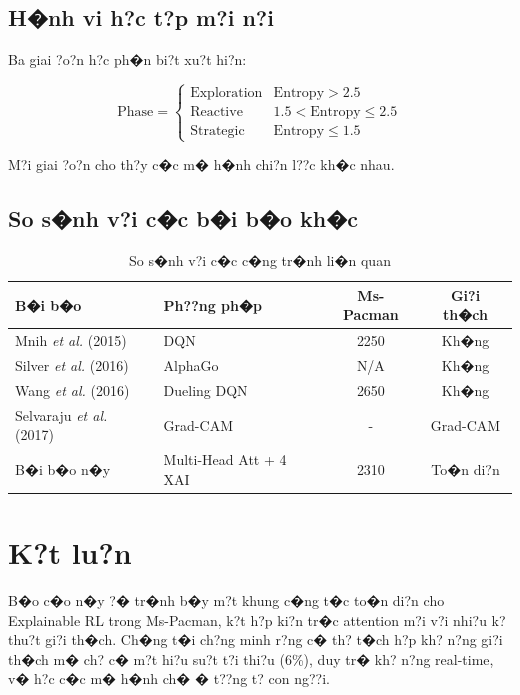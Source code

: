 \documentclass[11pt,a4paper]{article}
\begin{document}
\subsection{H�nh vi h?c t?p m?i n?i}

Ba giai ?o?n h?c ph�n bi?t xu?t hi?n:

\begin{equation}
\text{Phase} = \begin{cases}
\text{Exploration} & \text{Entropy} > 2.5 \\
\text{Reactive} & 1.5 < \text{Entropy} \le 2.5 \\
\text{Strategic} & \text{Entropy} \le 1.5
\end{cases}
\end{equation}

M?i giai ?o?n cho th?y c�c m� h�nh chi?n l??c kh�c nhau.

\subsection{So s�nh v?i c�c b�i b�o kh�c}

\begin{table}[H]
\centering
\small
\begin{tabular}{llcc}
\toprule
\textbf{B�i b�o} & \textbf{Ph??ng ph�p} & \textbf{Ms-Pacman} & \textbf{Gi?i th�ch} \\
\midrule
Mnih \textit{et al.} (2015) & DQN & 2250 & Kh�ng \\
Silver \textit{et al.} (2016) & AlphaGo & N/A & Kh�ng \\
Wang \textit{et al.} (2016) & Dueling DQN & 2650 & Kh�ng \\
Selvaraju \textit{et al.} (2017) & Grad-CAM & - & Grad-CAM \\
B�i b�o n�y & Multi-Head Att + 4 XAI & 2310 & To�n di?n \\
\bottomrule
\end{tabular}
\caption{So s�nh v?i c�c c�ng tr�nh li�n quan}
\end{table}

\section{K?t lu?n}

B�o c�o n�y ?� tr�nh b�y m?t khung c�ng t�c to�n di?n cho Explainable RL trong Ms-Pacman, k?t h?p ki?n tr�c attention m?i v?i nhi?u k? thu?t gi?i th�ch. Ch�ng t�i ch?ng minh r?ng c� th? t�ch h?p kh? n?ng gi?i th�ch m� ch? c� m?t hi?u su?t t?i thi?u (6\%), duy tr� kh? n?ng real-time, v� h?c c�c m� h�nh ch� � t??ng t? con ng??i.
\end{document}
